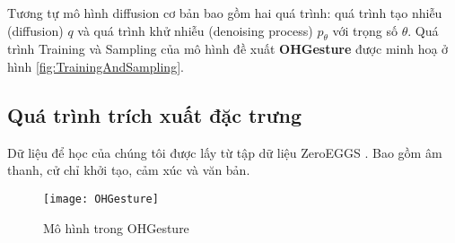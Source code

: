 Tương tự mô hình diffusion cơ bản bao gồm hai quá trình: quá trình tạo nhiễu (diffusion) $q$ và quá trình khử nhiễu (denoising process) $p_{\theta}$ với trọng số $\theta$. Quá trình Training và Sampling của mô hình đề xuất \textbf{OHGesture} được minh hoạ ở hình \ref{fig:TrainingAndSampling}.

\subsection{Quá trình trích xuất đặc trưng}

Dữ liệu để học của chúng tôi được lấy từ tập dữ liệu ZeroEGGS \cite{ghorbani2023zeroeggs}. Bao gồm âm thanh, cử chỉ khởi tạo, cảm xúc và văn bản.
\begin{figure*}
	\centering
	\texttt{[image: OHGesture]}
	\caption{Mô hình trong OHGesture}
	\label{fig:OHGesture}
\end{figure*}
\vspace{-10pt}

